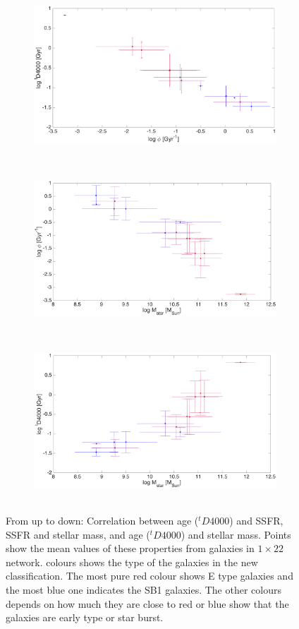                 \begin{figure}
        \begin{subfigure}[b]{\textwidth}
            \centering
            \includegraphics[width=\textwidth,height=6cm]{../images0.01/1d/age_vs_ssfr.png}
        \end{subfigure}
        \hfill
        \begin{subfigure}[b]{\textwidth}
            \includegraphics[width=\textwidth,height=6cm]{../images0.01/1d/ssfr_vs_stellar_mass.png}
        \end{subfigure}
        \hfill
        \begin{subfigure}[b]{\textwidth}
            \includegraphics[width=\textwidth,height=6cm]{../images0.01/1d/age_vs_stellar_mass.png}
        \end{subfigure}
        \caption{From up to down: Correlation between age ($^tD4000$) and SSFR, SSFR and stellar mass, and  age ($^tD4000$) and stellar mass. Points show the mean values of these properties from galaxies in $1\times22$ network. colours shows the type of the galaxies in the new classification. The most pure red colour shows E type galaxies and the most blue one indicates the SB1 galaxies. The other colours depends on how much they are close to red or blue show that the galaxies are early type or star burst.}
        \label{fig: props_vs_props}
    \end{figure}


